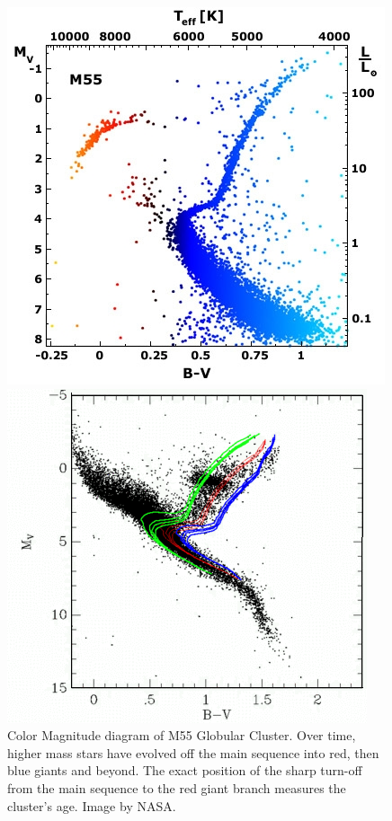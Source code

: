 \begin{figure}[H]
  \centering
  \begin{minipage}[b]{0.44\textwidth}
    \includegraphics[width=\textwidth]{images/m55_diagram.jpg}
    \caption[Color Magnitude diagram of M55]{Color Magnitude diagram of M55 Globular Cluster. Over time, higher mass stars have evolved off the main sequence into red, then blue giants and beyond. The exact position of the sharp turn-off from the main sequence to the red giant branch measures the cluster's age. Image by NASA.}
  \end{minipage}
  \hfill
  \begin{minipage}[b]{0.54\textwidth}
    \includegraphics[width=\textwidth]{images/color-magnitude.png}

\end{minipage}
\end{figure}
